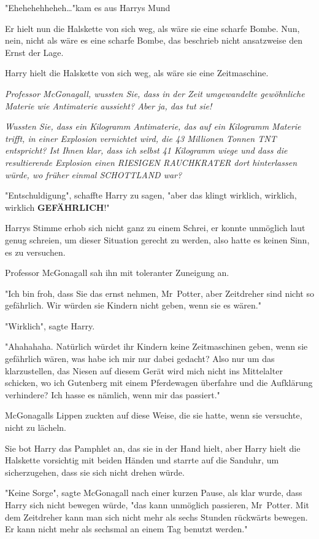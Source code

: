 {"Ehehehehheheh…"kam es aus Harrys Mund

Er hielt nun die Halskette von sich weg, als wäre sie eine scharfe Bombe. Nun, nein, nicht als wäre es eine scharfe Bombe, das beschrieb nicht ansatzweise den Ernst der Lage.

Harry hielt die Halskette von sich weg, als wäre sie eine Zeitmaschine.

\emph{Professor McGonagall, wussten Sie, dass in der Zeit umgewandelte gewöhnliche Materie wie Antimaterie aussieht? Aber ja, das tut sie!}

\emph{Wussten Sie, dass ein Kilogramm Antimaterie, das auf ein Kilogramm Materie trifft, in einer Explosion vernichtet wird, die 43 Millionen Tonnen TNT entspricht? Ist Ihnen klar, dass ich selbst 41 Kilogramm wiege und dass die resultierende Explosion einen RIESIGEN RAUCHKRATER dort hinterlassen würde, wo früher einmal SCHOTTLAND war?}

"Entschuldigung", schaffte Harry zu sagen, "aber das klingt wirklich, wirklich, wirklich \textbf{GEFÄHRLICH}!"

Harrys Stimme erhob sich nicht ganz zu einem Schrei, er konnte unmöglich laut genug schreien, um dieser Situation gerecht zu werden, also hatte es keinen Sinn, es zu versuchen.

Professor McGonagall sah ihn mit toleranter Zuneigung an.

"Ich bin froh, dass Sie das ernst nehmen, Mr~Potter, aber Zeitdreher sind nicht so gefährlich. Wir würden sie Kindern nicht geben, wenn sie es wären."

"Wirklich", sagte Harry.

"Ahahahaha. Natürlich würdet ihr Kindern keine Zeitmaschinen geben, wenn sie gefährlich wären, was habe ich mir nur dabei gedacht? Also nur um das klarzustellen, das Niesen auf diesem Gerät wird mich nicht ins Mittelalter schicken, wo ich Gutenberg mit einem Pferdewagen überfahre und die Aufklärung verhindere? Ich hasse es nämlich, wenn mir das passiert."

McGonagalls Lippen zuckten auf diese Weise, die sie hatte, wenn sie versuchte, nicht zu lächeln.

Sie bot Harry das Pamphlet an, das sie in der Hand hielt, aber Harry hielt die Halskette vorsichtig mit beiden Händen und starrte auf die Sanduhr, um sicherzugehen, dass sie sich nicht drehen würde.

"Keine Sorge", sagte McGonagall nach einer kurzen Pause, als klar wurde, dass Harry sich nicht bewegen würde, "das kann unmöglich passieren, Mr~Potter. Mit dem Zeitdreher kann man sich nicht mehr als sechs Stunden rückwärts bewegen. Er kann nicht mehr als sechsmal an einem Tag benutzt werden."

}
